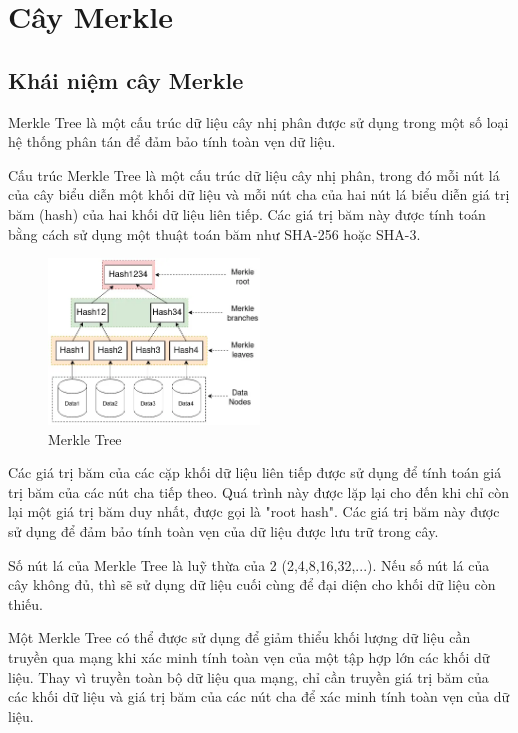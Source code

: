\section{Cây Merkle}
\subsection{Khái niệm cây Merkle}

Merkle Tree là một cấu trúc dữ liệu cây nhị phân được sử dụng trong một số loại hệ thống phân 
tán để đảm bảo tính toàn vẹn dữ liệu. 

Cấu trúc Merkle Tree là một cấu trúc dữ liệu cây nhị phân, trong đó mỗi nút lá của cây biểu diễn
một khối dữ liệu và mỗi nút cha của hai nút lá biểu diễn giá trị băm (hash) của hai khối dữ 
liệu liên tiếp. Các giá trị băm này được tính toán bằng cách sử dụng một thuật toán băm như 
SHA-256 hoặc SHA-3.


\begin{figure}[h]
    \centering
    \includegraphics[width=0.5\textwidth]{images/Merkle_Tree.png}
    \caption{Merkle Tree }
    \label{fig:merkle_tree}
\end{figure}

Các giá trị băm của các cặp khối dữ liệu liên tiếp được sử dụng để tính toán giá trị băm của 
các nút cha tiếp theo. Quá trình này được lặp lại cho đến khi chỉ còn lại một giá trị băm duy 
nhất, được gọi là "root hash". Các giá trị băm này được sử dụng để đảm bảo tính toàn vẹn của 
dữ liệu được lưu trữ trong cây.

Số nút lá của Merkle Tree là luỹ thừa của 2 (2,4,8,16,32,...). Nếu số nút lá của cây không
đủ, thì sẽ sử dụng dữ liệu cuối cùng để đại diện cho khối dữ liệu còn thiếu.



Một Merkle Tree có thể được sử dụng để giảm thiểu khối lượng dữ liệu cần truyền qua mạng khi 
xác minh tính toàn vẹn của một tập hợp lớn các khối dữ liệu. Thay vì truyền toàn bộ dữ liệu qua
mạng, chỉ cần truyền giá trị băm của các khối dữ liệu và giá trị băm của các nút cha để xác minh tính toàn vẹn của dữ liệu.


